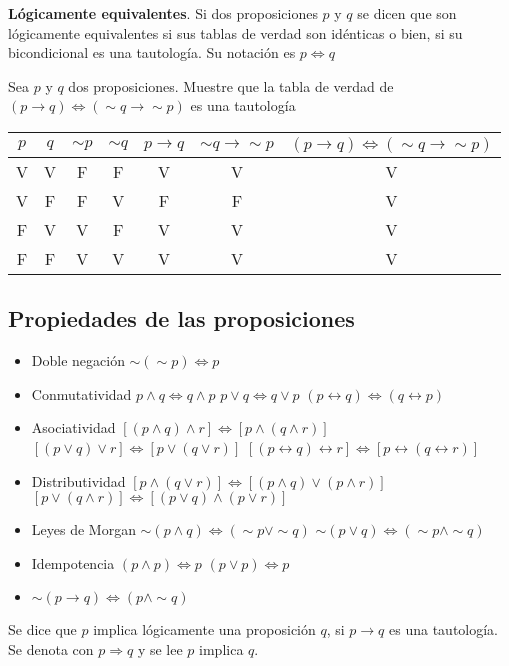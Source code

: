 \begin{mydef}
\textbf{Lógicamente equivalentes}. Si dos proposiciones $p$ y $q$ se dicen que son lógicamente equivalentes si sus tablas de verdad son idénticas o bien, si su bicondicional es una tautología. Su notación es $p\Leftrightarrow q$ 
\end{mydef}

\begin{myexample}
Sea $p$ y $q$ dos proposiciones. Muestre que la tabla de verdad de $(p\rightarrow q)\Leftrightarrow (\sim q\rightarrow\sim p)$ es una tautología
\end{myexample}

\begin{center}
	\begin{tabular}{|c|c|c|c|c|c|c|}
\hline
$p$&$q$&$\sim p$& $\sim q$&$p\rightarrow q$&$\sim q\rightarrow\sim p$&$(p\rightarrow q)\Leftrightarrow (\sim q\rightarrow\sim p)$\\
\hline
V&V&F&F&V&V&V\\
\hline
V&F&F&V&F&F&V\\
\hline
F&V&V&F&V&V&V\\
\hline
F&F&V&V&V&V&V\\
\hline
	\end{tabular}
\end{center}

\subsection{Propiedades de las proposiciones}

\begin{itemize}
	\item Doble negación
		\subitem $\sim(\sim p)\Leftrightarrow p$
	\item Conmutatividad
		\subitem $p\wedge q\Leftrightarrow q\wedge p$
		\subitem $p\vee q\Leftrightarrow q\vee p$
		\subitem $(p\longleftrightarrow q)\Leftrightarrow(q\longleftrightarrow p)$
	\item Asociatividad
		\subitem $[(p\wedge q)\wedge r]\Leftrightarrow[p\wedge(q\wedge r)]$
		\subitem $[(p\vee q)\vee r]\Leftrightarrow[p\vee(q\vee r)]$
		\subitem $[(p\longleftrightarrow q)\longleftrightarrow r]\Leftrightarrow[p\longleftrightarrow(q\longleftrightarrow r)]$
	\item  Distributividad
		\subitem $[p\wedge(q\vee r)]\Leftrightarrow[(p\wedge q)\vee(p\wedge r)]$
		\subitem $[p\vee(q\wedge r)]\Leftrightarrow[(p\vee q)\wedge(p\vee r)]$
	\item Leyes de Morgan
		\subitem $\sim(p\wedge q) \Leftrightarrow (\sim p\vee\sim q)$
		\subitem $\sim(p\vee q)\Leftrightarrow(\sim p\wedge\sim q)$
	\item Idempotencia
		\subitem $(p\wedge p)\Leftrightarrow p$
		\subitem $(p\vee p)\Leftrightarrow p$
	\item $\sim(p\longrightarrow q)\Leftrightarrow (p\wedge\sim q)$
\end{itemize}
Se dice que $p$ implica lógicamente una proposición $q$, si $p\longrightarrow q$ es una tautología. Se denota con $p\Rightarrow q$ y se lee $p$ implica $q$.\\